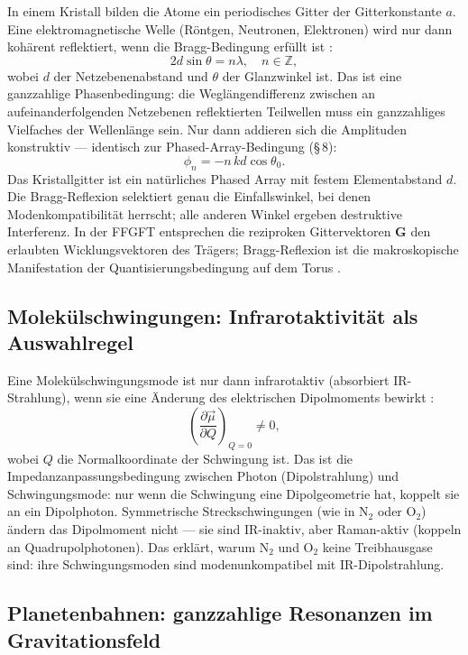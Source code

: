 In einem Kristall bilden die Atome ein periodisches Gitter der
Gitterkonstante $a$. Eine elektromagnetische Welle (Röntgen, Neutronen,
Elektronen) wird nur dann kohärent reflektiert, wenn die
Bragg-Bedingung erfüllt ist \cite{Kittel2005,Ashcroft1976}:
\[
  2d\sin\theta = n\lambda, \quad n \in \mathbb{Z},
\]
wobei $d$ der Netzebenenabstand und $\theta$ der Glanzwinkel ist.
Das ist eine ganzzahlige Phasenbedingung: die Weglängendifferenz
zwischen an aufeinanderfolgenden Netzebenen reflektierten Teilwellen
muss ein ganzzahliges Vielfaches der Wellenlänge sein. Nur dann
addieren sich die Amplituden konstruktiv --- identisch zur
Phased-Array-Bedingung (§\,8):
\[
  \phi_n = -n\,kd\cos\theta_0.
\]
Das Kristallgitter ist ein natürliches Phased Array mit festem
Elementabstand $d$. Die Bragg-Reflexion selektiert genau die
Einfallswinkel, bei denen Modenkompatibilität herrscht; alle anderen
Winkel ergeben destruktive Interferenz. In der FFGFT entsprechen
die reziproken Gittervektoren $\mathbf{G}$ den erlaubten
Wicklungsvektoren des Trägers; Bragg-Reflexion ist die makroskopische
Manifestation der Quan\-ti\-sie\-rungs\-be\-din\-gung auf dem Torus \SM.

\subsection*{Molekülschwingungen: Infrarotaktivität als Auswahlregel}

Eine Molekülschwingungsmode ist nur dann infrarotaktiv (absorbiert
IR-Strahlung), wenn sie eine Änderung des elektrischen Dipolmoments
bewirkt \cite{Atkins2010,Wilson1955}:
\[
  \left(\frac{\partial \vec{\mu}}{\partial Q}\right)_{Q=0} \neq 0,
\]
wobei $Q$ die Normalkoordinate der Schwingung ist. Das ist die
Im\-pe\-danz\-an\-pas\-sungs\-be\-din\-gung zwischen Photon (Dipolstrahlung) und
Schwingungsmode: nur wenn die Schwingung eine Dipolgeometrie hat,
koppelt sie an ein Dipolphoton. Symmetrische Streckschwingungen (wie
in N$_2$ oder O$_2$) ändern das Dipolmoment nicht --- sie sind
IR-inaktiv, aber Raman-aktiv (koppeln an Quadrupolphotonen). Das
erklärt, warum N$_2$ und O$_2$ keine Treibhausgase sind: ihre
Schwingungsmoden sind modenunkompatibel mit IR-Dipolstrahlung.

\subsection*{Planetenbahnen: ganzzahlige Resonanzen im Gravitationsfeld}


